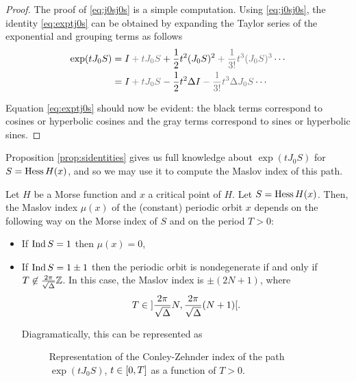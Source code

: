 \begin{proof}
The proof of \eqref{eq:j0sj0s} is a simple computation. Using \eqref{eq:j0sj0s}, the identity \eqref{eq:exptj0s} can be obtained by expanding the Taylor series of the exponential and grouping terms as follows
\begin{equation}
\begin{aligned}
\exp(t J_0 S) &= 
I \color{black!60} + t J_0 S \color{black} + \frac12 t^2 (J_0 S)^2 \color{black!60} +\frac1{3!} t^3 (J_0 S)^3 \color{black} \cdots \\
&= 
I \color{black!60} + t J_0 S \color{black} - \frac12 t^2 \Delta I \color{black!60} -\frac1{3!} t^3 \Delta J_0 S \color{black} \cdots
\end{aligned}
\end{equation}

Equation \eqref{eq:exptj0s} should now be evident: the black terms correspond to cosines or hyperbolic cosines and the gray terms correspond to sines or hyperbolic sines.
\end{proof}

Proposition \ref{prop:sidentities} gives us full knowledge about $\exp(t J_0 S)$ for $S = \operatorname{Hess} H(x)$, and so we may use it to compute the Maslov index of this path.

\begin{prop}\label{maslovmorse}
Let $H$ be a Morse function and $x$ a critical point of $H$. Let $S = \operatorname{Hess} H(x)$. Then, the Maslov index $\mu(x)$ of the (constant) periodic orbit $x$ depends on the following way on the Morse index of $S$ and on the period $T > 0$:
\begin{itemize}
\item If $\operatorname{Ind} S = 1$ then $\mu(x) = 0$,
\item If $\operatorname{Ind} S = 1 \pm 1$ then the periodic orbit is nondegenerate if and only if $T \not \in \frac{2 \pi}{\sqrt\Delta} \mathbb{Z}$. In this case, the Maslov index is $\pm(2N+1)$, where
\begin{equation}
T \in \ointerval{\frac{2\pi}{\sqrt\Delta}N}{\frac{2\pi}{\sqrt\Delta}(N+1)}.
\end{equation}

Diagramatically, this can be represented as
\begin{figure}[H]
\centering
{}
\caption{Representation of the Conley-Zehnder index of the path $\exp(t J_0 S)$, $t \in \interval 0 T$ as a function of $T > 0$.}
\end{figure}
\end{itemize}
\end{prop}

